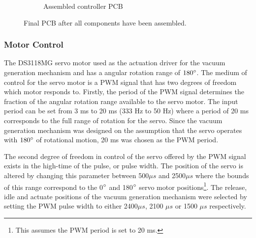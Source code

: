 \begin{figure}[!ht]
\begin{subfigure}{.5\textwidth}
		\caption{Assembled controller PCB}
	\label{fig:assembled-robotic-controller}
	\end{subfigure}%
	\caption{Final PCB after all components have been assembled.}
	\label{fig:pcb-assembly}
\end{figure}



\subsubsection{Motor Control} \label{sec:Motor Control}

The DS3118MG servo motor used as the actuation driver for the vacuum generation mechanism and has a angular rotation range of $180^{\circ}$. The medium of control for the servo motor is a PWM signal that has two degrees of freedom which motor responds to. Firstly, the period of the PWM signal determines the fraction of the angular rotation range available to the servo motor. The input period can be set from 3 ms to 20 ms (333 Hz to 50 Hz) where a period of 20 ms corresponds to the full range of rotation for the servo. Since the vacuum generation mechanism was designed on the assumption that the servo operates with $180^{\circ}$ of rotational motion, 20 ms was chosen as the PWM period.

The second degree of freedom in control of the servo offered by the PWM signal exists in the high-time of the pulse, or pulse width. The position of the servo is altered by changing this parameter between 500$\mu s$ and 2500$\mu s$ where the bounds of this range correspond to the 0$^{\circ}$ and 180$^{\circ}$ servo motor positions\footnote{This assumes the PWM period is set to 20 ms.}. The release, idle and actuate positions of the vacuum generation mechanism were selected by setting the PWM pulse width to either 2400$\mu s$, 2100 $\mu s$ or 1500 $\mu s$ respectively.

